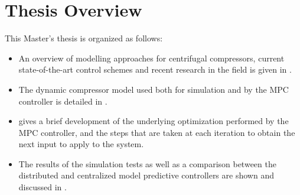 \section{Thesis Overview}
\label{sec:intro:overview}

This Master's thesis is organized as follows:

\begin{itemize}
  \item An overview of modelling approaches for centrifugal compressors, current state-of-the-art control schemes and recent research in the field is given in .
  \item The dynamic compressor model used both for simulation and by the MPC controller is detailed in .
  \item {} gives a brief development of the underlying optimization performed by the MPC controller, and the steps that are taken at each iteration to obtain the next input to apply to the system.
  \item The results of the simulation tests as well as a comparison between the distributed and centralized model predictive controllers are shown and discussed in .
\end{itemize}

